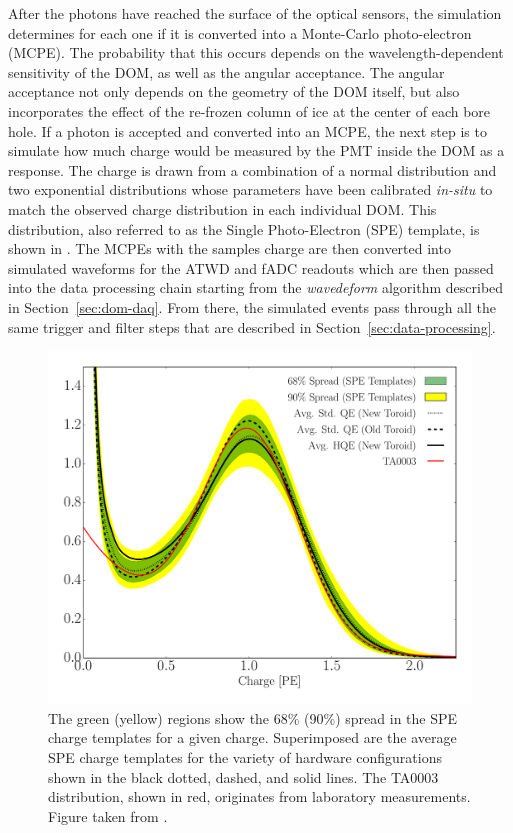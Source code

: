 After the photons have reached the surface of the optical sensors, the simulation determines for each one if it is converted into a Monte-Carlo photo-electron (MCPE).
The probability that this occurs depends on the wavelength-dependent sensitivity of the DOM, as well as the angular acceptance.
The angular acceptance not only depends on the geometry of the DOM itself, but also incorporates the effect of the re-frozen column of ice at the center of each bore hole.
If a photon is accepted and converted into an MCPE, the next step is to simulate how much charge would be measured by the PMT inside the DOM as a response.
The charge is drawn from a combination of a normal distribution and two exponential distributions whose parameters have been calibrated \emph{in-situ} to match the observed charge distribution in each individual DOM.
This distribution, also referred to as the Single Photo-Electron (SPE) template, is shown in .
The MCPEs with the samples charge are then converted into simulated waveforms for the ATWD and fADC readouts which are then passed into the data processing chain starting from the \emph{wavedeform} algorithm described in Section~\ref{sec:dom-daq}.
From there, the simulated events pass through all the same trigger and filter steps that are described in Section~\ref{sec:data-processing}.

\begin{figure}
    \centering
    \includegraphics[width=0.8\linewidth]{figures/icecube/detector_response/SPE_TA003_2.pdf}
    \caption{The green (yellow) regions show the 68\% (90\%) spread in the SPE charge templates for a given charge.  Superimposed are the average SPE charge templates for the variety of hardware configurations shown in the black dotted, dashed, and solid lines. The TA0003 distribution, shown in red, originates from laboratory measurements. Figure taken from \cite{ic_spe_20}.}
    \label{fig:spe-templates}
\end{figure}

